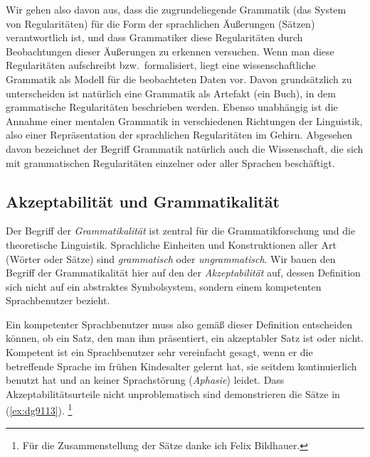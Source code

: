 
Wir gehen also davon aus, dass die zugrundeliegende Grammatik (das System von Regularitäten) für die Form der sprachlichen Äußerungen (\zB Sätzen) verantwortlich ist, und dass Grammatiker diese Regularitäten durch Beobachtungen dieser Äußerungen zu erkennen versuchen.
Wenn man diese Regularitäten aufschreibt bzw.\ formalisiert, liegt eine wissenschaftliche Grammatik als Modell für die beobachteten Daten vor.
Davon grundsätzlich zu unterscheiden ist natürlich eine Grammatik als Artefakt (\zB ein Buch), in dem grammatische Regularitäten beschrieben werden.
Ebenso unabhängig ist die Annahme einer mentalen Grammatik in verschiedenen Richtungen der Linguistik, also einer Repräsentation der sprachlichen Regularitäten im Gehirn.
Abgesehen davon bezeichnet der Begriff Grammatik natürlich auch die Wissenschaft, die sich mit grammatischen Regularitäten einzelner oder aller Sprachen beschäftigt.

\subsection{Akzeptabilität und Grammatikalität}

\label{sec:akzeptabilitaetgrammatikalitaet}


Der Begriff der \textit{Grammatikalität} ist zentral für die Grammatikforschung und die theoretische Linguistik.
Sprachliche Einheiten und Konstruktionen aller Art (\zB Wörter oder Sätze) sind \textit{grammatisch} oder \textit{ungrammatisch}.
Wir bauen den Begriff der Grammatikalität hier auf den der \textit{Akzeptabilität} auf, dessen Definition sich nicht auf ein abstraktes Symbolsystem, sondern einem kompetenten Sprachbenutzer bezieht.


Ein kompetenter Sprachbenutzer muss also gemäß dieser Definition entscheiden können, ob ein Satz, den man ihm präsentiert, ein akzeptabler Satz ist oder nicht.
Kompetent ist ein Sprachbenutzer sehr vereinfacht gesagt, wenn er die betreffende Sprache im frühen Kindesalter gelernt hat, sie seitdem kontinuierlich benutzt hat und an keiner Sprachstörung (\textit{Aphasie}) leidet.
Dass Akzeptabilitätsurteile nicht unproblematisch sind demonstrieren die Sätze in (\ref{ex:dg9113}).%
\footnote{Für die Zusammenstellung der Sätze danke ich Felix Bildhauer.}

